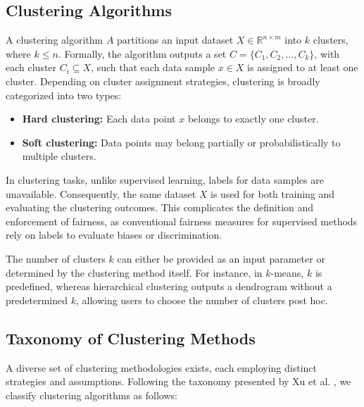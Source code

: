 \subsection{Clustering Algorithms}
A clustering algorithm \(A\) partitions an input dataset \(X \in \mathbb{R}^{n \times m}\) into \(k\) clusters, where \(k \leq n\). Formally, the algorithm outputs a set \(C = \{C_1, C_2, \dots, C_k\}\), with each cluster \(C_i \subseteq X\), such that each data sample \(x \in X\) is assigned to at least one cluster. Depending on cluster assignment strategies, clustering is broadly categorized into two types:

\begin{itemize}
    \item \textbf{Hard clustering:} Each data point \(x\) belongs to exactly one cluster.
    \item \textbf{Soft clustering:} Data points may belong partially or probabilistically to multiple clusters.
\end{itemize}

In clustering tasks, unlike supervised learning, labels for data samples are unavailable. Consequently, the same dataset \(X\) is used for both training and evaluating the clustering outcomes. This complicates the definition and enforcement of fairness, as conventional fairness measures for supervised methods rely on labels to evaluate biases or discrimination.

The number of clusters \(k\) can either be provided as an input parameter or determined by the clustering method itself. For instance, in \(k\)-means, \(k\) is predefined, whereas hierarchical clustering outputs a dendrogram without a predetermined \(k\), allowing users to choose the number of clusters post hoc.

\subsection{Taxonomy of Clustering Methods}
A diverse set of clustering methodologies exists, each employing distinct strategies and assumptions. Following the taxonomy presented by Xu et al. \cite{XuSurvey}, we classify clustering algorithms as follows:

